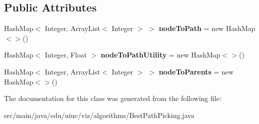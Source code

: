 \subsection*{Public Attributes}
\begin{DoxyCompactItemize}
\item 
\mbox{\label{classedu_1_1uiuc_1_1viz_1_1algorithms_1_1_best_path_picking_a7d334d4083d1a212e08b023999c1f117}} 
Hash\+Map$<$ Integer, Array\+List$<$ Integer $>$ $>$ {\bfseries node\+To\+Path} = new Hash\+Map$<$$>$()
\item 
\mbox{\label{classedu_1_1uiuc_1_1viz_1_1algorithms_1_1_best_path_picking_add076de1734183fe364c2dc6faefded2}} 
Hash\+Map$<$ Integer, Float $>$ {\bfseries node\+To\+Path\+Utility} = new Hash\+Map$<$$>$()
\item 
\mbox{\label{classedu_1_1uiuc_1_1viz_1_1algorithms_1_1_best_path_picking_ad4ce6d453b0ab1180f912ab5dcb9886a}} 
Hash\+Map$<$ Integer, Array\+List$<$ Integer $>$ $>$ {\bfseries node\+To\+Parents} = new Hash\+Map$<$$>$()
\end{DoxyCompactItemize}


The documentation for this class was generated from the following file\+:\begin{DoxyCompactItemize}
\item 
src/main/java/edu/uiuc/viz/algorithms/Best\+Path\+Picking.\+java\end{DoxyCompactItemize}
